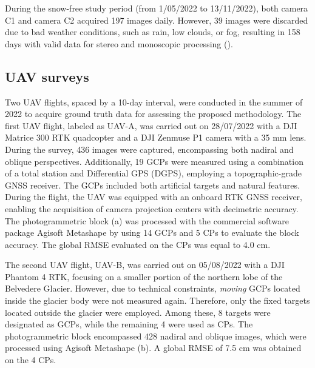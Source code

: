 During the snow-free study period (from 1/05/2022 to 13/11/2022), both camera C1 and camera C2 acquired 197 images daily. 
However, 39 images were discarded due to bad weather conditions, such as rain, low clouds, or fog, resulting in 158 days with valid data for stereo and monoscopic processing ().

\subsection{UAV surveys}\label{sec:4:uavsurveys}

Two UAV flights, spaced by a 10-day interval, were conducted in the summer of 2022 to acquire ground truth data for assessing the proposed methodology.
The first UAV flight, labeled as UAV-A, was carried out on 28/07/2022 with a DJI Matrice 300 RTK quadcopter and a DJI Zenmuse P1 camera with a 35 mm lens.
During the survey, 436 images were captured, encompassing both nadiral and oblique perspectives.
Additionally, 19 GCPs were measured using a combination of a total station and Differential GPS (DGPS), employing a topographic-grade GNSS receiver.
The GCPs included both artificial targets and natural features.
During the flight, the UAV was equipped with an onboard RTK GNSS receiver, enabling the acquisition of camera projection centers with decimetric accuracy.
The photogrammetric block (a) was processed with the commercial software package Agisoft Metashape \citep{agisoft} by using 14 GCPs and 5 CPs to evaluate the block accuracy.
The global RMSE evaluated on the CPs was equal to 4.0 cm.

The second UAV flight, UAV-B, was carried out on 05/08/2022 with a DJI Phantom 4 RTK, focusing on a smaller portion of the northern lobe of the Belvedere Glacier.
However, due to technical constraints, \textit{moving} GCPs located inside the glacier body were not measured again.
Therefore, only the fixed targets located outside the glacier were employed.
Among these, 8 targets were designated as GCPs, while the remaining 4 were used as CPs.
The photogrammetric block encompassed 428 nadiral and oblique images, which were processed using Agisoft Metashape (b).
A global RMSE of 7.5 cm was obtained on the 4 CPs.

